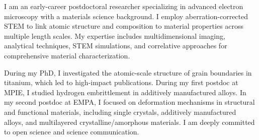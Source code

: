 \begin{justify}
{I am an early-career postdoctoral researcher specializing in advanced electron microscopy with a materials science background. I employ aberration-corrected STEM to link atomic structure and composition to material properties across multiple length scales. My expertise includes multidimensional imaging, analytical techniques, STEM simulations, and correlative approaches for comprehensive material characterization. \\

\par
During my PhD, I investigated the atomic-scale structure of grain boundaries in titanium, which led to high-impact publications. During my first postdoc at MPIE, I studied hydrogen embrittlement in additively manufactured alloys. In my second postdoc at EMPA, I focused on deformation mechanisms in structural and functional materials, including single crystals, additively manufactured alloys, and multilayered crystalline/amorphous materials. I am deeply committed to open science and science communication.}

\end{justify}
